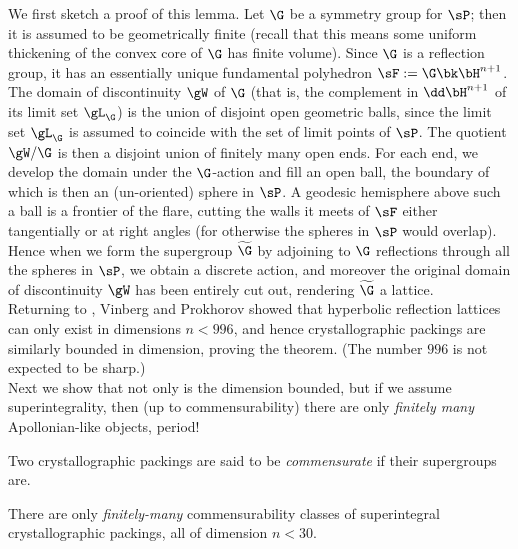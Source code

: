 \documentclass[12pt,reqno]{amsart}
\begin{document}
We first sketch a proof of this lemma. Let $\G$ be a symmetry group for $\sP$; then it is assumed to be geometrically finite (recall that this means some uniform thickening of the convex core of $\G$ has finite volume). 
Since $\G$ is a reflection group, it has an essentially unique fundamental polyhedron $\sF:=\G\bk\bH^{n+1}$.
The domain of discontinuity $\gW$ of $\G$ (that is, the complement in $\dd\bH^{n+1}$ of its limit set $\gL_\G$) is the union of disjoint open geometric balls, since the limit set $\gL_\G$ is assumed to coincide with the set of limit points of $\sP$. 
The quotient $\gW/\G$ is then a disjoint union of finitely many open ends.
For each end, we 
develop the domain  under the $\G$-action  
and fill an open ball,
 the boundary of which is then an  (un-oriented) sphere in $\sP$. 
A geodesic hemisphere   
above such a ball is a frontier of the flare, cutting the walls it meets of 
$\sF$
either tangentially or at right angles (for otherwise the spheres in $\sP$ would overlap).
Hence when  we form the supergroup $\widetilde\G$ by adjoining  to $\G$ reflections through all the spheres in $\sP$,
we obtain a discrete action, and moreover the original domain of discontinuity $\gW$ has been entirely cut out, rendering $\widetilde\G$ a lattice. 
\\

Returning to ,
Vinberg \cite{Vinberg1981} and Prokhorov \cite{Prokhorov1986}  showed that hyperbolic reflection lattices  can only exist in dimensions $n<996$, and hence crystallographic packings are similarly bounded in dimension, proving the theorem. (The number $996$ is not expected to be sharp.) 
\\


Next we show that not only is the dimension bounded, but if we assume superintegrality, then (up to commensurability) there are only {\it finitely many}  Apollonian-like objects, period!

\begin{Def}
Two crystallographic packings are said to be {\it commensurate} if their supergroups are.
\end{Def}

\begin{thm}\label{thm:main}
There are only {\em finitely-many} commensurability classes 
 of superintegral crystallographic packings,  all of dimension $n<30$. 
\end{thm}
\end{document}
